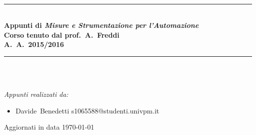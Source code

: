 
\begin{titlepage}

\newcommand{\HRule}{\rule{\textwidth}{0.5mm}} %

\center %


\addtolength{\textwidth}{30pt}
\setlength{\oddsidemargin}{18pt}
\setlength{\hoffset}{-5pt}
\setlength{\voffset}{-60pt}


\begin{minipage}{\textwidth}
\center
\textsc{}\\[5.25cm]
\HRule \\[0.5cm]
{\LARGE \bfseries Appunti di \emph{Misure e Strumentazione per l'Automazione}}\\[0.3cm]
{\large \bfseries Corso tenuto dal prof.~A.~Freddi}\\[0.3cm]
{\normalsize \bfseries A.~A.~2015/2016}\\[0.3cm]
\HRule \\[0.5cm]
\textsc{}\\[3cm]
\textsc{}
\end{minipage}
 

\begin{minipage}{\textwidth}
\emph{Appunti realizzati da:}
\begin{itemize}%
 \item Davide~Benedetti  s1065588@studenti.univpm.it
\end{itemize}
{\footnotesize Aggiornati in data \today}
\end{minipage}\\[0.5cm]

\vfill %

\end{titlepage}